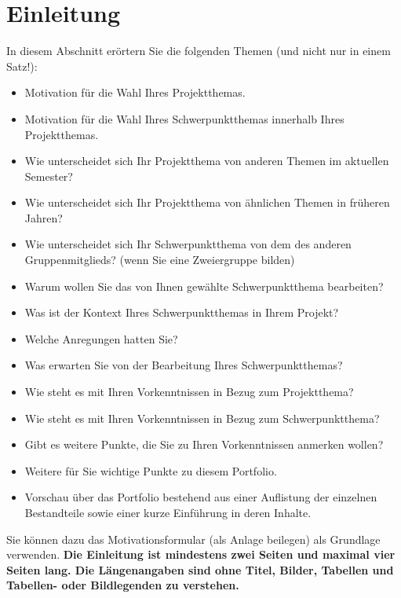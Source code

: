 \chapter{Einleitung}
\label{chap:einleitung}

\begin{hinweise}
In diesem Abschnitt erörtern Sie die folgenden Themen (und nicht nur in einem Satz!):
\begin{itemize}\itemsep0pt
\item Motivation für die Wahl Ihres Projektthemas.
\item Motivation für die Wahl Ihres Schwerpunktthemas innerhalb Ihres Projektthemas.
\item Wie unterscheidet sich Ihr Projektthema von anderen Themen im aktuellen Semester?
\item Wie unterscheidet sich Ihr Projektthema von ähnlichen Themen in früheren Jahren?
\item Wie unterscheidet sich Ihr Schwerpunktthema von dem des anderen Gruppenmitglieds? (wenn Sie eine Zweiergruppe bilden)
\item Warum wollen Sie das von Ihnen gewählte Schwerpunktthema bearbeiten?
\item Was ist der Kontext Ihres Schwerpunktthemas in Ihrem Projekt?
\item Welche Anregungen hatten Sie?
\item Was erwarten Sie von der Bearbeitung Ihres Schwerpunktthemas?
\item Wie steht es mit Ihren Vorkenntnissen in Bezug zum Projektthema?
\item Wie steht es mit Ihren Vorkenntnissen in Bezug zum Schwerpunktthema?
\item Gibt es weitere Punkte, die Sie zu Ihren Vorkenntnissen anmerken wollen?
\item Weitere für Sie wichtige Punkte zu diesem Portfolio.
\item Vorschau über das Portfolio bestehend aus einer Auflistung der einzelnen Bestandteile sowie einer kurze Einführung in deren Inhalte.
\end{itemize}
Sie können dazu das Motivationsformular (als Anlage beilegen) als Grundlage verwenden.
\textbf{Die Einleitung ist mindestens zwei Seiten und maximal vier Seiten lang. Die Längenangaben sind ohne Titel, Bilder, Tabellen und Tabellen- oder Bildlegenden zu verstehen.}


\end{hinweise}
